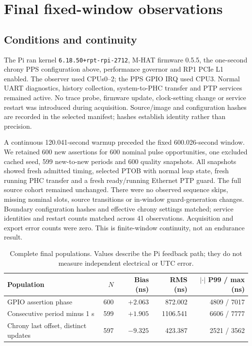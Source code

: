 \documentclass[10pt,letterpaper]{article}
\newcommand{\code}[1]{\texttt{\small #1}}
\begin{document}
\section{Final fixed-window observations}
\subsection{Conditions and continuity}
The Pi ran kernel \code{6.18.50+rpt-rpi-2712}, M-HAT firmware 0.5.5, the
one-second chrony PPS configuration above, performance governor and RP1 PCIe
L1 enabled. The observer used CPUs0--2; the PPS GPIO IRQ used CPU3. Normal UART
diagnostics, history collection, system-to-PHC transfer and PTP services remained
active. No trace probe, firmware update, clock-setting change or service restart
was introduced during acquisition. Source/image and configuration hashes are
recorded in the selected manifest; hashes establish identity rather than precision.

A continuous 120.041-second warmup preceded the fixed 600.026-second window.
We retained 600 new assertions for 600 nominal pulse opportunities, one excluded
cached seed, 599 new-to-new periods and 600 quality snapshots. All snapshots
showed fresh admitted timing, selected PTOB with normal leap state, fresh running
PHC transfer and a fresh ready/running Ethernet PTP guard. The full source cohort
remained unchanged. There were no observed sequence skips, missing nominal slots,
source transitions or in-window guard-generation changes. Boundary configuration
hashes and effective chrony settings matched; service identities and restart counts
matched across 41 observations. Acquisition and export error counts were zero.
This is finite-window continuity, not an endurance result.

\begin{table}[ht]
\centering\small
\caption{Complete final populations. Values describe the Pi feedback path;
they do not measure independent electrical or UTC error.}
\begin{tabular}{lrrrr}
\toprule Population & $N$ & Bias (ns) & RMS (ns) & $|\cdot|$ P99 / max (ns)\\
\midrule
GPIO assertion phase & 600 & $+2.063$ & 872.002 & 4809 / 7017\\
Consecutive period minus 1 s & 599 & $+1.905$ & 1106.541 & 6606 / 7777\\
Chrony last offset, distinct updates & 597 & $-9.325$ & 423.387 & 2521 / 3562\\
\bottomrule
\end{tabular}
\label{tab:phase}
\end{table}
\end{document}
